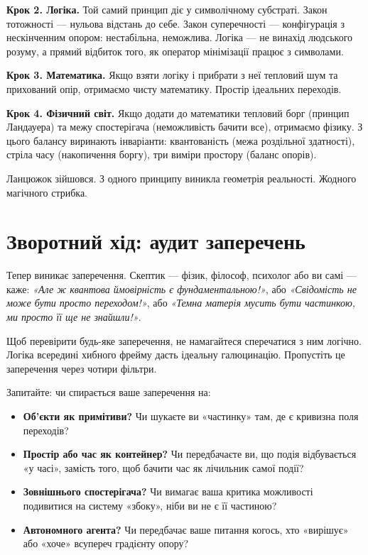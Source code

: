 \documentclass[12pt, a4paper, openany]{book}
\begin{document}
\textbf{Крок 2. Логіка.} Той самий принцип діє у символічному субстраті. Закон тотожності — нульова відстань до себе. Закон суперечності — конфігурація з нескінченним опором: нестабільна, неможлива. Логіка — не винахід людського розуму, а прямий відбиток того, як оператор мінімізації працює з символами.

\textbf{Крок 3. Математика.} Якщо взяти логіку і прибрати з неї тепловий шум та прихований опір, отримаємо чисту математику. Простір ідеальних переходів.

\textbf{Крок 4. Фізичний світ.} Якщо додати до математики тепловий борг (принцип Ландауера) та межу спостерігача (неможливість бачити все), отримаємо фізику. З цього балансу виринають інваріанти: квантованість (межа роздільної здатності), стріла часу (накопичення боргу), три виміри простору (баланс опорів).

Ланцюжок зійшовся. З одного принципу виникла геометрія реальності. Жодного магічного стрибка.

\section{Зворотний хід: аудит заперечень}

Тепер виникає заперечення. Скептик — фізик, філософ, психолог або ви самі — каже:
\textit{«Але ж квантова ймовірність є фундаментальною!»}, або \textit{«Свідомість не може бути просто переходом!»}, або \textit{«Темна матерія мусить бути частинкою, ми просто її ще не знайшли!»}.

Щоб перевірити будь-яке заперечення, не намагайтеся сперечатися з ним логічно. Логіка всередині хибного фрейму дасть ідеальну галюцинацію. Пропустіть це заперечення через чотири фільтри.

Запитайте: чи спирається ваше заперечення на:
\begin{itemize}
    \item \textbf{Об'єкти як примітиви?} Чи шукаєте ви «частинку» там, де є кривизна поля переходів?
    \item \textbf{Простір або час як контейнер?} Чи передбачаєте ви, що подія відбувається «у часі», замість того, щоб бачити час як лічильник самої події?
    \item \textbf{Зовнішнього спостерігача?} Чи вимагає ваша критика можливості подивитися на систему «збоку», ніби ви не є її частиною?
    \item \textbf{Автономного агента?} Чи передбачає ваше питання когось, хто «вирішує» або «хоче» всупереч градієнту опору?
\end{itemize}
\end{document}
